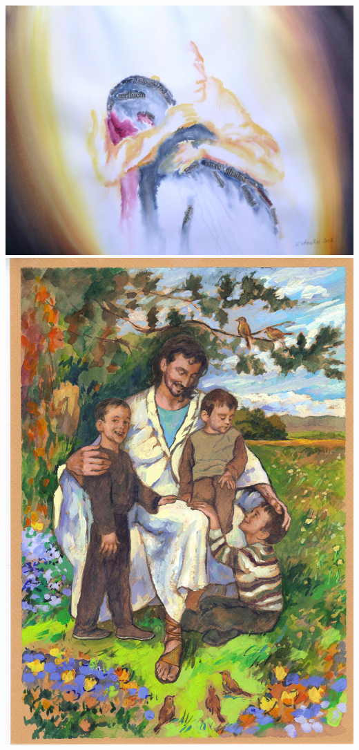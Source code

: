 \documentclass[a4paper,twoside, svgnames]{article}
\begin{document}
\newpage
\begin{center}
\includegraphics[width=\linewidth]{images/susanne/g7_nichtskannunstrennen}\\
\vspace*{1cm}
\includegraphics[width=0.9\linewidth]{images/susanne/h8_allesaaufdenkopfgestellt2}
\end{center}
\end{document}
